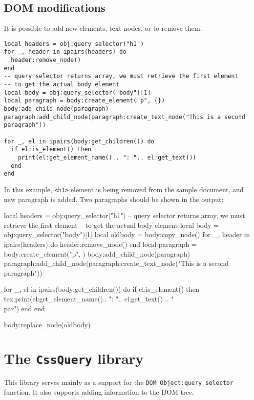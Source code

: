\documentclass{ltxdoc}
\begin{document}
\subsection{DOM modifications}

It is possible to add new elements, text nodes, or to remove them. 

\begin{verbatim}
local headers = obj:query_selector("h1")
for _, header in ipairs(headers) do
  header:remove_node()
end
-- query selector returns array, we must retrieve the first element
-- to get the actual body element
local body = obj:query_selector("body")[1]
local paragraph = body:create_element("p", {})
body:add_child_node(paragraph)
paragraph:add_child_node(paragraph:create_text_node("This is a second paragraph"))

for _, el in ipairs(body:get_children()) do
  if el:is_element() then
    print(el:get_element_name().. ": ".. el:get_text())
  end
end
\end{verbatim}

In this example, \verb|<h1>| element is being removed from the sample document, and new 
paragraph is added. Two paragraphs should be shown in the output:

\begin{framed}
  \begin{luacode*}
local headers = obj:query_selector("h1")
-- query selector returns array, we must retrieve the first element
-- to get the actual body element
local body = obj:query_selector("body")[1]
local oldbody = body:copy_node()
for _, header in ipairs(headers) do
  header:remove_node()
end
local paragraph = body:create_element("p", {})
body:add_child_node(paragraph)
paragraph:add_child_node(paragraph:create_text_node("This is a second paragraph"))

for _, el in ipairs(body:get_children()) do
if el:is_element() then
  tex.print(el:get_element_name().. ": ".. el:get_text() .. "\\par")
end
end

body:replace_node(oldbody)
  \end{luacode*}
\end{framed}


\section{The \texttt{CssQuery} library}

This library serves mainly as a support for the
\texttt{DOM\_Object:query\_selector} function. It also supports adding
information to the DOM tree.
\end{document}
